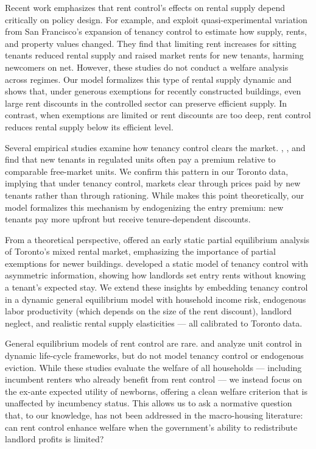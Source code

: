 \documentclass[parskip=full]{article}
\begin{document}
Recent work emphasizes that rent control’s effects on rental supply depend critically on policy design. For example, \citet{diamond-2019} and \citet{dmq-2019} exploit quasi-experimental variation from San Francisco’s expansion of tenancy control to estimate how supply, rents, and property values changed. They find that limiting rent increases for sitting tenants reduced rental supply and raised market rents for new tenants, harming newcomers on net. However, these studies do not conduct a welfare analysis across regimes. Our model formalizes this type of rental supply dynamic and shows that, under generous exemptions for recently constructed buildings, even large rent discounts in the controlled sector can preserve efficient supply. In contrast, when exemptions are limited or rent discounts are too deep, rent control reduces rental supply below its efficient level.

Several empirical studies examine how tenancy control clears the market. \citet{nagy-1997}, \citet{early-2000}, and \citet{cjq-2023} find that new tenants in regulated units often pay a premium relative to comparable free-market units. We confirm this pattern in our Toronto data, implying that under tenancy control, markets clear through prices paid by new tenants rather than through rationing. While \citet{arnott-1995} makes this point theoretically, our model formalizes this mechanism by endogenizing the entry premium: new tenants pay more upfront but receive tenure-dependent discounts.

From a theoretical perspective, \citet{fallis-1985} offered an early static partial equilibrium analysis of Toronto’s mixed rental market, emphasizing the importance of partial exemptions for newer buildings. \citet{be-2000} developed a static model of tenancy control with asymmetric information, showing how landlords set entry rents without knowing a tenant’s expected stay. We extend these insights by embedding tenancy control in a dynamic general equilibrium model with household income risk, endogenous labor productivity (which depends on the size of the rent discount), landlord neglect, and realistic rental supply elasticities — all calibrated to Toronto data.

General equilibrium models of rent control are rare. \citet{eric-1995} and \citet{fmn-2023} analyze unit control in dynamic life-cycle frameworks, but do not model tenancy control or endogenous eviction. While these studies evaluate the welfare of all households — including incumbent renters who already benefit from rent control — we instead focus on the ex-ante expected utility of newborns, offering a clean welfare criterion that is unaffected by incumbency status. This allows us to ask a normative question that, to our knowledge, has not been addressed in the macro-housing literature: can rent control enhance welfare when the government’s ability to redistribute landlord profits is limited?
\end{document}
